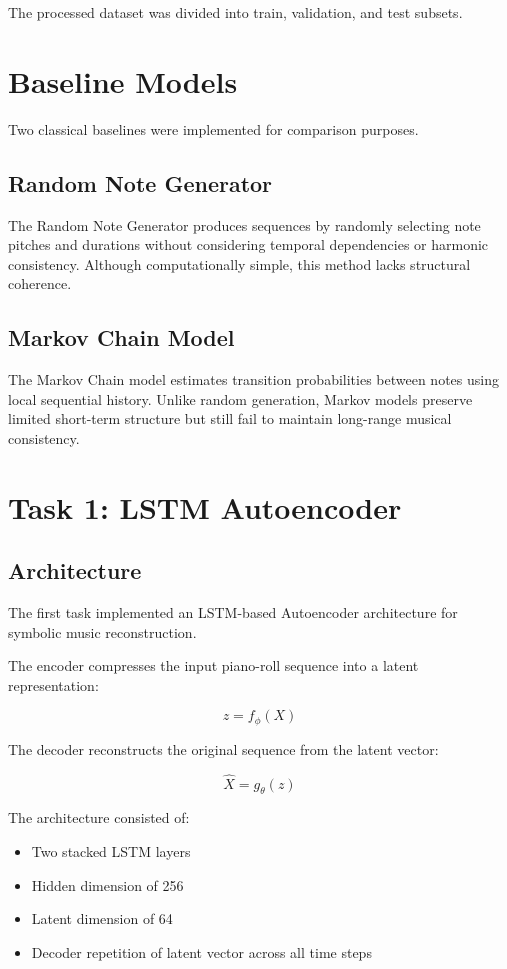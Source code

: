 \documentclass[conference]{IEEEtran}
\begin{document}
The processed dataset was divided into train, validation, and test subsets.

\section{Baseline Models}
Two classical baselines were implemented for comparison purposes.

\subsection{Random Note Generator}
The Random Note Generator produces sequences by randomly selecting note pitches and durations without considering temporal dependencies or harmonic consistency. Although computationally simple, this method lacks structural coherence.

\subsection{Markov Chain Model}
The Markov Chain model estimates transition probabilities between notes using local sequential history. Unlike random generation, Markov models preserve limited short-term structure but still fail to maintain long-range musical consistency.

\section{Task 1: LSTM Autoencoder}
\subsection{Architecture}
The first task implemented an LSTM-based Autoencoder architecture for symbolic music reconstruction.

The encoder compresses the input piano-roll sequence into a latent representation:

\begin{equation}
z = f_{\phi}(X)
\end{equation}

The decoder reconstructs the original sequence from the latent vector:

\begin{equation}
\hat{X} = g_{\theta}(z)
\end{equation}

The architecture consisted of:

\begin{itemize}
    \item Two stacked LSTM layers
    \item Hidden dimension of 256
    \item Latent dimension of 64
    \item Decoder repetition of latent vector across all time steps
\end{itemize}
\end{document}
